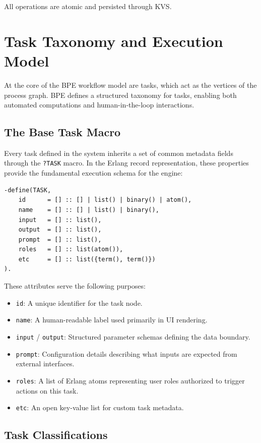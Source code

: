\documentclass[11pt,a4paper]{article}
\begin{document}
All operations are atomic and persisted through KVS.

\newpage
\section{Task Taxonomy and Execution Model}

At the core of the BPE workflow model are tasks, which act as the vertices of the process graph. BPE defines a structured taxonomy for tasks, enabling both automated computations and human-in-the-loop interactions.

\subsection{The Base Task Macro}

Every task defined in the system inherits a set of common metadata fields through the \texttt{?TASK} macro. In the Erlang record representation, these properties provide the fundamental execution schema for the engine:

\begin{lstlisting}
-define(TASK,
    id      = [] :: [] | list() | binary() | atom(),
    name    = [] :: [] | list() | binary(),
    input   = [] :: list(),
    output  = [] :: list(),
    prompt  = [] :: list(),
    roles   = [] :: list(atom()),
    etc     = [] :: list({term(), term()})
).
\end{lstlisting}

These attributes serve the following purposes:
\begin{itemize}
    \item \texttt{id}: A unique identifier for the task node.
    \item \texttt{name}: A human-readable label used primarily in UI rendering.
    \item \texttt{input} / \texttt{output}: Structured parameter schemas defining the data boundary.
    \item \texttt{prompt}: Configuration details describing what inputs are expected from external interfaces.
    \item \texttt{roles}: A list of Erlang atoms representing user roles authorized to trigger actions on this task.
    \item \texttt{etc}: An open key-value list for custom task metadata.
\end{itemize}

\subsection{Task Classifications}
\end{document}
